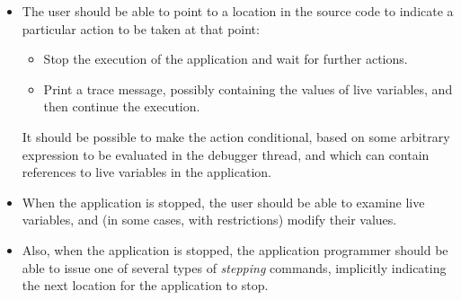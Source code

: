 \begin{itemize}
\item The user should be able to point to a location
  in the source code to indicate a particular action to be taken at
  that point:
  \begin{itemize}
  \item Stop the execution of the application and wait for further
    actions.
  \item Print a trace message, possibly containing the values of live
    variables, and then continue the execution. 
  \end{itemize}
  It should be possible to make the action conditional, based on some
  arbitrary expression to be evaluated in the debugger thread, and
  which can contain references to live variables in the application.
\item When the application is stopped, the user
  should be able to examine live variables, and (in some cases, with
  restrictions) modify their values.
\item Also, when the application is stopped, the application
  programmer should be able to issue one of several types of
  \emph{stepping} commands, implicitly indicating the next location
  for the application to stop.
\end{itemize}
